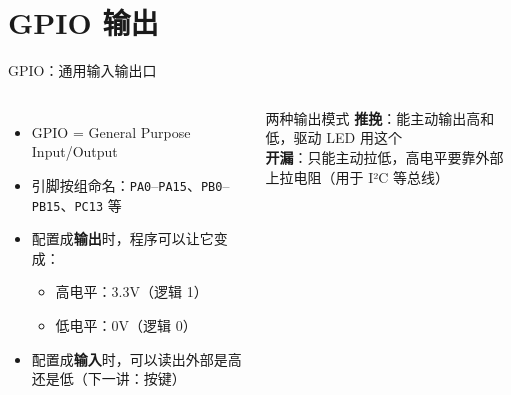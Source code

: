\documentclass[aspectratio=169,11pt]{ctexbeamer}
\begin{document}
\section{GPIO 输出}

\begin{frame}{GPIO：通用输入输出口}
  \begin{columns}[T]
    \begin{itemize}
      \item GPIO = General Purpose Input/Output
      \item 引脚按组命名：\texttt{PA0}--\texttt{PA15}、\texttt{PB0}--\texttt{PB15}、\texttt{PC13} 等
      \item 配置成\textbf{输出}时，程序可以让它变成：
        \begin{itemize}
          \item 高电平：3.3V（逻辑 1）
          \item 低电平：0V（逻辑 0）
        \end{itemize}
      \item 配置成\textbf{输入}时，可以读出外部是高还是低（下一讲：按键）
    \end{itemize}
    \begin{block}{两种输出模式}
      \small
      \textbf{推挽}：能主动输出高和低，\alert{驱动 LED 用这个}\\[3pt]
      \textbf{开漏}：只能主动拉低，高电平要靠外部上拉电阻（用于 I²C 等总线）
    \end{block}
  \end{columns}
\end{frame}
\end{document}

